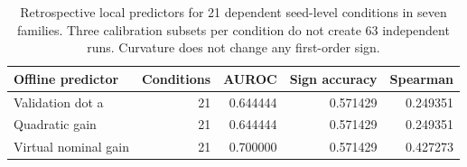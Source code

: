 \begin{table}[htbp]
\centering\small
\begin{tabular}{lrrrr}
\toprule
Offline predictor & Conditions & AUROC & Sign accuracy & Spearman \\
\midrule
Validation dot a & 21 & 0.644444 & 0.571429 & 0.249351 \\
Quadratic gain & 21 & 0.644444 & 0.571429 & 0.249351 \\
Virtual nominal gain & 21 & 0.700000 & 0.571429 & 0.427273 \\
\bottomrule
\end{tabular}
\caption{Retrospective local predictors for 21 dependent seed-level conditions in seven families. Three calibration subsets per condition do not create 63 independent runs. Curvature does not change any first-order sign.}
\label{tab:local_diagnostics}
\end{table}
